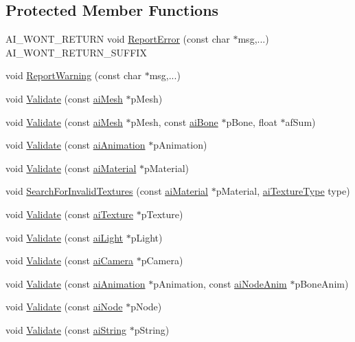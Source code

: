 \subsection*{Protected Member Functions}
\begin{DoxyCompactItemize}
\item 
A\+I\+\_\+\+W\+O\+N\+T\+\_\+\+R\+E\+T\+U\+R\+N void \hyperlink{class_assimp_1_1_validate_d_s_process_a6efb18bf509d75da51f811a280e9c392}{Report\+Error} (const char $\ast$msg,...) A\+I\+\_\+\+W\+O\+N\+T\+\_\+\+R\+E\+T\+U\+R\+N\+\_\+\+S\+U\+F\+F\+I\+X
\item 
void \hyperlink{class_assimp_1_1_validate_d_s_process_a8e65937485a42c3f0613ecb8d0e0b238}{Report\+Warning} (const char $\ast$msg,...)
\item 
void \hyperlink{class_assimp_1_1_validate_d_s_process_a98786c27d6c5668e36fb0f0e71f7cb8f}{Validate} (const \hyperlink{structai_mesh}{ai\+Mesh} $\ast$p\+Mesh)
\item 
void \hyperlink{class_assimp_1_1_validate_d_s_process_a9157598ee8e2ef6bed9c42947cf2b942}{Validate} (const \hyperlink{structai_mesh}{ai\+Mesh} $\ast$p\+Mesh, const \hyperlink{structai_bone}{ai\+Bone} $\ast$p\+Bone, float $\ast$af\+Sum)
\item 
void \hyperlink{class_assimp_1_1_validate_d_s_process_ad93403b2f76cb6ab9701777fe4dbee45}{Validate} (const \hyperlink{structai_animation}{ai\+Animation} $\ast$p\+Animation)
\item 
void \hyperlink{class_assimp_1_1_validate_d_s_process_ad47c4afde0e91e134600954a9c274494}{Validate} (const \hyperlink{classai_material}{ai\+Material} $\ast$p\+Material)
\item 
void \hyperlink{class_assimp_1_1_validate_d_s_process_a089a1032f290e1f3fd990ee9224e7d0b}{Search\+For\+Invalid\+Textures} (const \hyperlink{classai_material}{ai\+Material} $\ast$p\+Material, \hyperlink{material_8h_a7dd415ff703a2cc53d1c22ddbbd7dde0}{ai\+Texture\+Type} type)
\item 
void \hyperlink{class_assimp_1_1_validate_d_s_process_aa6f2831afa7e202d162da3043af8503e}{Validate} (const \hyperlink{structai_texture}{ai\+Texture} $\ast$p\+Texture)
\item 
void \hyperlink{class_assimp_1_1_validate_d_s_process_a86827a515bc0ece4146a19ce29d91e4c}{Validate} (const \hyperlink{structai_light}{ai\+Light} $\ast$p\+Light)
\item 
void \hyperlink{class_assimp_1_1_validate_d_s_process_a8b89f8ad18d3fbaa53fc035263f11181}{Validate} (const \hyperlink{structai_camera}{ai\+Camera} $\ast$p\+Camera)
\item 
void \hyperlink{class_assimp_1_1_validate_d_s_process_a3a55af70b54a5065651384b2bc195308}{Validate} (const \hyperlink{structai_animation}{ai\+Animation} $\ast$p\+Animation, const \hyperlink{structai_node_anim}{ai\+Node\+Anim} $\ast$p\+Bone\+Anim)
\item 
void \hyperlink{class_assimp_1_1_validate_d_s_process_a4183d51ca3d024aa52b0b94359e42e48}{Validate} (const \hyperlink{structai_node}{ai\+Node} $\ast$p\+Node)
\item 
void \hyperlink{class_assimp_1_1_validate_d_s_process_af5c8c238cd0353a83f28757558b94812}{Validate} (const \hyperlink{structai_string}{ai\+String} $\ast$p\+String)
\end{DoxyCompactItemize}
